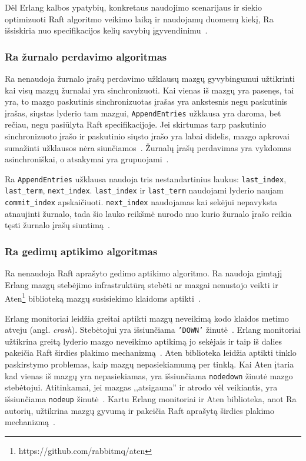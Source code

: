 \documentclass{VUMIFPSkursinis}
\begin{document}
Dėl Erlang kalbos ypatybių, konkretaus naudojimo scenarijaus ir siekio optimizuoti Raft algoritmo veikimo laiką ir naudojamų duomenų kiekį, Ra išsiskiria nuo specifikacijos kelių savybių įgyvendinimu~\cite{rabbitmqra}.

\subsubsection{Ra žurnalo perdavimo algoritmas}

Ra nenaudoja žurnalo įrašų perdavimo užklausų mazgų gyvybingumui užtikrinti kai visų mazgų žurnalai yra sinchronizuoti. Kai vienas iš mazgų yra pasenęs, tai yra, to mazgo paskutinis sinchronizuotas įrašas yra ankstesnis negu paskutinis įrašas, siųstas lyderio tam mazgui, \texttt{AppendEntries} užklausa yra daroma, bet rečiau, negu pasiūlyta Raft specifikacijoje. Jei skirtumas tarp paskutinio sinchronizuoto įrašo ir paskutinio siųsto įrašo yra labai didelis, mazgo apkrovai sumažinti užklausos nėra siunčiamos~\cite{rabbitmqra}. Žurnalų įrašų perdavimas yra vykdomas asinchroniškai, o atsakymai yra grupuojami~\cite{rabbitmqra}.

Ra \texttt{AppendEntries} užklausa naudoja tris nestandartinius laukus: \texttt{last\_index}, \texttt{last\_term}, \texttt{next\_index}. \texttt{last\_index} ir \texttt{last\_term} naudojami lyderio naujam \texttt{commit\_index} apskaičiuoti. \texttt{next\_index} naudojamas kai sekėjui nepavyksta atnaujinti žurnalo, tada šio lauko reikšmė nurodo nuo kurio žurnalo įrašo reikia tęsti žurnalo įrašų siuntimą~\cite{rabbitmqra}.

\subsubsection{Ra gedimų aptikimo algoritmas}

Ra nenaudoja Raft aprašyto gedimo aptikimo algoritmo. Ra naudoja gimtąjį Erlang mazgų stebėjimo infrastruktūrą stebėti ar mazgai nenustojo veikti ir Aten\footnote{https://github.com/rabbitmq/aten} biblioteką mazgų susisiekimo klaidoms aptikti~\cite{rabbitmqra}.

Erlang monitoriai leidžia greitai aptikti mazgų neveikimą kodo klaidos metimo atveju (angl. \textit{crash}). Stebėtojui yra išsiunčiama \texttt{'DOWN'} žinutė~\cite{ericsson_erlang_processes_2016}. Erlang monitoriai užtikrina greitą lyderio mazgo neveikimo aptikimą jo sekėjais ir taip iš dalies pakeičia Raft širdies plakimo mechanizmą~\cite{rabbitmqra}. Aten biblioteka leidžia aptikti tinklo paskirstymo problemas, kaip mazgų nepasiekiamumą per tinklą. Kai Aten įtaria kad vienas iš mazgų yra nepasiekiamas, yra išsiunčiama \texttt{nodedown} žinutė mazgo stebėtojui. Atitinkamai, jei mazgas ,,atsigauna'' ir atrodo vėl veikiantis, yra išsiunčiama \texttt{nodeup} žinutė~\cite{rabbitmq_aten_2020}. Kartu Erlang monitoriai ir Aten biblioteka, anot Ra autorių, užtikrina mazgų gyvumą ir pakeičia Raft aprašytą širdies plakimo mechanizmą~\cite{rabbitmqra}.
\end{document}
